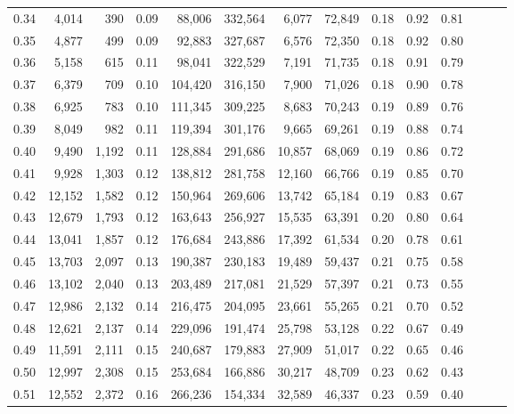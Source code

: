 \begin{tabular}{rrrrrrrrrrrrrr}
0.34 &   4,014 &    390 &  0.09 &   88,006 &  332,564 &   6,077 &  72,849 &  0.18 &  0.92 &      0.81 \\
0.35 &   4,877 &    499 &  0.09 &   92,883 &  327,687 &   6,576 &  72,350 &  0.18 &  0.92 &      0.80 \\
0.36 &   5,158 &    615 &  0.11 &   98,041 &  322,529 &   7,191 &  71,735 &  0.18 &  0.91 &      0.79 \\
0.37 &   6,379 &    709 &  0.10 &  104,420 &  316,150 &   7,900 &  71,026 &  0.18 &  0.90 &      0.78 \\
0.38 &   6,925 &    783 &  0.10 &  111,345 &  309,225 &   8,683 &  70,243 &  0.19 &  0.89 &      0.76 \\
0.39 &   8,049 &    982 &  0.11 &  119,394 &  301,176 &   9,665 &  69,261 &  0.19 &  0.88 &      0.74 \\
0.40 &   9,490 &  1,192 &  0.11 &  128,884 &  291,686 &  10,857 &  68,069 &  0.19 &  0.86 &      0.72 \\
0.41 &   9,928 &  1,303 &  0.12 &  138,812 &  281,758 &  12,160 &  66,766 &  0.19 &  0.85 &      0.70 \\
0.42 &  12,152 &  1,582 &  0.12 &  150,964 &  269,606 &  13,742 &  65,184 &  0.19 &  0.83 &      0.67 \\
0.43 &  12,679 &  1,793 &  0.12 &  163,643 &  256,927 &  15,535 &  63,391 &  0.20 &  0.80 &      0.64 \\
0.44 &  13,041 &  1,857 &  0.12 &  176,684 &  243,886 &  17,392 &  61,534 &  0.20 &  0.78 &      0.61 \\
0.45 &  13,703 &  2,097 &  0.13 &  190,387 &  230,183 &  19,489 &  59,437 &  0.21 &  0.75 &      0.58 \\
0.46 &  13,102 &  2,040 &  0.13 &  203,489 &  217,081 &  21,529 &  57,397 &  0.21 &  0.73 &      0.55 \\
0.47 &  12,986 &  2,132 &  0.14 &  216,475 &  204,095 &  23,661 &  55,265 &  0.21 &  0.70 &      0.52 \\
0.48 &  12,621 &  2,137 &  0.14 &  229,096 &  191,474 &  25,798 &  53,128 &  0.22 &  0.67 &      0.49 \\
0.49 &  11,591 &  2,111 &  0.15 &  240,687 &  179,883 &  27,909 &  51,017 &  0.22 &  0.65 &      0.46 \\
0.50 &  12,997 &  2,308 &  0.15 &  253,684 &  166,886 &  30,217 &  48,709 &  0.23 &  0.62 &      0.43 \\
0.51 &  12,552 &  2,372 &  0.16 &  266,236 &  154,334 &  32,589 &  46,337 &  0.23 &  0.59 &      0.40 \\

\end{tabular}
